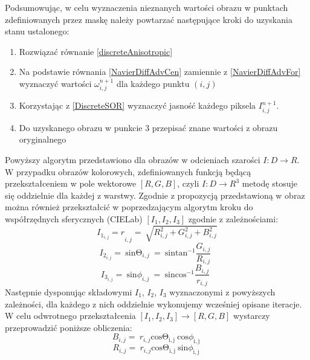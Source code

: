 \documentclass[12pt, twoside, openany]{report}
\theoremstyle{definition}
\begin{document}
\par
Podsumowując, w celu wyznaczenia nieznanych wartości obrazu w punktach zdefiniowanych przez maskę należy powtarzać następujące kroki do uzyskania stanu ustalonego:
\begin{enumerate}
\item
Rozwiązać równanie \eqref{discreteAnisotropic} 
\item
Na podstawie równania \eqref{NavierDiffAdvCen} zamiennie z \eqref{NavierDiffAdvFor} wyznaczyć wartości $\omega_{i,j}^{n+1}$ dla każdego punktu $(i,j)$ 
\item
Korzystając z \eqref{DiscreteSOR} wyznaczyć jasność każdego piksela $I_{i,j}^{n+1}$.
\item
Do uzyskanego obrazu w punkcie 3 przepisać znane wartości z obrazu oryginalnego
\end{enumerate}
Powyższy algorytm przedstawiono dla obrazów w odcieniach szarości $I:D\to R$. W przypadku obrazów kolorowych, zdefiniowanych funkcją będącą przekształceniem w pole wektorowe $[R,G,B]$, czyli $I:D\to R^3$ metodę stosuje się oddzielnie dla każdej z warstwy. Zgodnie z propozycją przedstawioną w \cite{fishelov2006image} obraz można również przekształcić w poprzedzającym algorytm kroku do współrzędnych sferycznych (CIELab) $\left[I_{1},I_{2},I_{3} \right]$ zgodnie z zależnościami:
\begin{equation}
{I_{1_{i,j}}=r}_{i,j}=\ \sqrt{R^2_{i,j}+G^2_{i,j}+B^2_{i,j}}
\label{TIone}
\end{equation}
\begin{equation}
I_{2_{i,j}}=\ {\mathrm{sin} {\mathrm{\Theta }}_{i,j}\ }=\ {\mathrm{sin} {{\mathrm{tan}}^{-1} \frac{G_{i,j}}{R_{i,j}}\ }\ } 
\label{TItwo}
\end{equation}
\begin{equation}
I_{3_{i,j}}=\ {\mathrm{sin} {\phi }_{i,j}\ }=\ {\mathrm{sin} {{\mathrm{cos}}^{-1} \frac{B_{i,j}}{r_{i,j}}\ }\ } 
\label{TIthree}
\end{equation}
Następnie dysponując składowymi $I_1$, $I_2$, $I_3$ wyznaczonymi z powyższych zależności, dla każdego z nich oddzielnie wykonujemy wcześniej opisane iteracje. W celu odwrotnego przekształcenia $\left[I_1,I_2,I_3 \right]\to\left[R,G,B\right]$ wystarczy przeprowadzić poniższe obliczenia:
\begin{equation}
 B_{i,j}=\ r_{i,j}{\mathrm{cos} {\mathrm{\Theta }}_{\mathrm{i,j}}\ }{\mathrm{cos} {\phi }_{\mathrm{i,j}}\ }
\label{TInvIone}
\end{equation}
\begin{equation}
R_{i,j}=\ r_{i,j}{\mathrm{cos} {\mathrm{\Theta }}_{\mathrm{i,j}}\ }{\mathrm{sin} {\phi }_{\mathrm{i,j}}\ }
\label{TInvItwo}
\end{equation}
\end{document}
